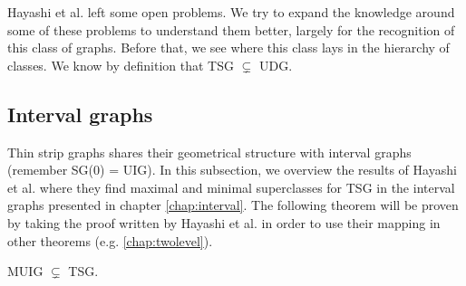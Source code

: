 Hayashi et al. left some open problems. We try to expand the knowledge around some of these problems
to understand them better, largely for the recognition of this class of graphs. Before that, we see where this class lays in the hierarchy of classes. We know by definition that TSG $\subsetneq$ UDG.

\subsection{Interval graphs}

Thin strip graphs shares their geometrical structure with interval graphs (remember SG($0$) = UIG). In this subsection, we overview the results of Hayashi et al. \cite{hayashiThinStripGraphs2017} where they find maximal and minimal superclasses for TSG in the interval graphs presented in chapter \ref{chap:interval}. The following theorem will be proven by taking the proof written by Hayashi et al. in order to use their mapping in other theorems (e.g. \ref{chap:twolevel}).

\begin{theorem}
  \label{theo:muigTSG}
  MUIG $\subsetneq$ TSG.
\end{theorem}

